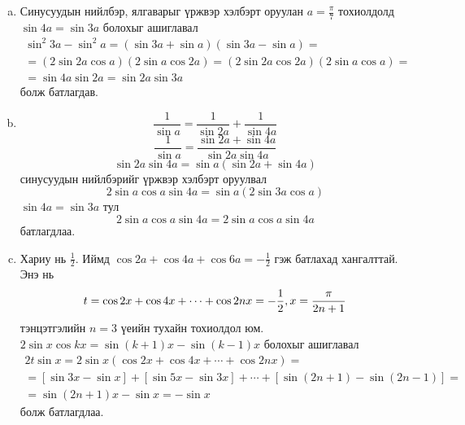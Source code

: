 \documentclass[10pt,a4paper,oneside]{book}
\begin{document}
\TheSolution
\begin{enumerate}[(a)]
\item
Синусуудын нийлбэр, ялгаварыг үржвэр хэлбэрт оруулан $a=\frac{\pi}{7}$ тохиолдолд $\sin 4a = \sin 3a$ болохыг ашиглавал
\begin{align*}
\sin^2 3a - \sin^2a = (\sin 3a + \sin a)(\sin 3a - \sin a) = \\
= (2\sin 2a\cos a)(2\sin a\cos 2a) = (2\sin 2a\cos 2a)(2\sin a \cos a) = \\
= \sin 4a \sin 2a = \sin 2a \sin 3a
\end{align*}
болж батлагдав.

\item
\begin{equation*}
\frac{1}{\sin a} = \frac{1}{\sin 2a} + \frac{1}{\sin 4a}
\end{equation*}
\begin{equation*}
\frac{1}{\sin a} = \frac{\sin 2a + \sin 4a}{\sin 2a\sin 4a}
\end{equation*}
\begin{equation*}
\sin 2a\sin 4a = \sin a(\sin 2a + \sin 4a)
\end{equation*}
синусуудын нийлбэрийг үржвэр хэлбэрт оруулвал
\begin{equation*}
2\sin a \cos a \sin 4a = \sin a (2\sin 3a\cos a)
\end{equation*}
$\sin 4a = \sin 3a$ тул
\begin{equation*}
2\sin a \cos a \sin 4a = 2\sin a \cos a \sin 4a
\end{equation*}
батлагдлаа.

\item
Хариу нь $\frac{1}{2}$. Иймд $\cos 2a + \cos 4a + \cos 6a = -\frac{1}{2}$ гэж батлахад хангалттай.
Энэ нь
\begin{equation*}
t = \cos 2x + \cos 4x + \cdots + \cos 2nx = -\frac{1}{2}, \vspace{1cm} x=\frac{\pi}{2n+1}
\end{equation*}
тэнцэтгэлийн $n=3$ үеийн тухайн тохиолдол юм. $2\sin x\cos kx = \sin (k+1)x - \sin (k-1)x$ болохыг ашиглавал
\begin{align*}
2t\sin x = 2\sin x (\cos 2x + \cos 4x + \cdots + \cos 2nx) = \\
= [\sin 3x - \sin x]+ [\sin 5x - \sin 3x] + \cdots + [\sin (2n+1) - \sin (2n-1)] =\\
= \sin (2n + 1)x - \sin x = -\sin x
\end{align*}
болж батлагдлаа.


\end{enumerate}
\end{document}

